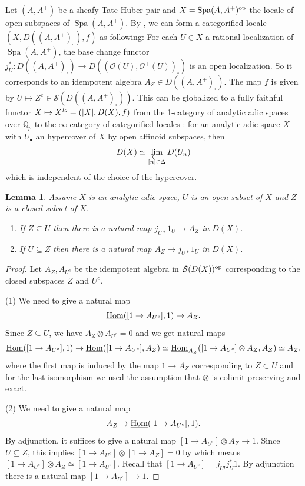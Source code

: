 \documentclass[a4paper,10pt]{amsart}
\theoremstyle{remark}
\theoremstyle{definition}
\theoremstyle{plain}
\newtheorem{lemma}[theorem]{Lemma}
\numberwithin{equation}{section}
\newcommand{\bbQ}{{\mathbb Q}}
\newcommand{\calO}{{\mathcal O}}
\newcommand{\calS}{{\mathcal S}}
\newcommand{\Hom}{{\rm Hom}}
\newcommand{\uHom}{\underline{\Hom}}
\DeclareMathOperator{\Spa}{Spa}
\begin{document}
Let $(A,A^+)$ be a sheafy Tate Huber pair and $X=\Spa(A,A^+)^{\rm op}$ the locale of open subspaces of $\Spa(A,A^+)$. By \cite[Prop.~2.3.2]{camargo2024analytic}, we can form a categorified locale $(X,D((A,A^+)_\square),f)$ as following: For each $U\in X$ a rational localization of $\Spa(A,A^+)$, the base change functor $j_U^*: D((A,A^+)_\square)\to D((\calO(U),\calO^+(U))_\square)$ is an open localization. So it corresponds to an idempotent algebra $A_Z\in D((A,A^+)_\square)$. The map $f$ is given by $U\mapsto Z^c\in \calS(D((A,A^+)_\square))$. This can be globalized to a fully faithful functor $X\mapsto X^{\it lo}=(|X|,D(X),f)$ from the 1-category of analytic adic spaces over $\bbQ_p$ to the $\infty$-category of categorified locales \cite[Cor.~2.3.4]{camargo2024analytic}: for an analytic adic space $X$ with $U_{\bullet} $ an hypercover of $X$ by open affinoid subspaces, then 
\begin{equation}\label{equationformulaDX}
	D(X)\simeq\varprojlim_{[n]\in \Delta} D(U_{n})
\end{equation}
which is independent of the choice of the hypercover.
\begin{lemma}\label{lemmafactor} 
Assume $X$ is an analytic adic space, $U$ is an open subset of $X$ and $Z$ is a closed subset of $X$.
	\begin{enumerate}
	    \item If $Z\subseteq U$ then there is a natural map $j_{U*}1_{U}\to A_Z$ in $D(X)$. 
		\item If $U\subseteq Z$ then there is a natural map $A_Z\to j_{U*}1_{U}$ in $D(X)$.
	\end{enumerate}
\end{lemma}
\begin{proof}
	Let $A_Z,A_{U^c}$ be the idempotent algebra in $\calS(D(X))^{\rm op}$ corresponding to the closed subspaces $Z$ and $U^c$.

	(1) We need to give a natural map 
	$$\uHom([1\to A_{U^c}],1)\to A_Z.$$
	Since $Z\subseteq U$, we have $A_Z\otimes A_{U^c}=0$ \cite[Prop.~5.3(1)]{scholze2022complex} and we get natural maps
	$$\uHom([1\to A_{U^c}],1)\to \uHom([1\to A_{U^c}],A_Z)\simeq \uHom_{A_Z}([1\to A_{U^c}]\otimes A_Z,A_Z)\simeq A_Z,$$
	where the first map is induced by the map $1\rightarrow A_Z$ corresponding to $Z\subset U$ and for the last isomorphism we used the assumption that $\otimes$ is colimit preserving and exact.

	(2) We need to give a natural map
	$$A_Z\to \uHom([1\to A_{U^c}],1).$$
	By adjunction, it suffices to give a natural map $[1\to A_{U^c}]\otimes A_Z\to 1$. Since $U\subseteq Z$, this implies $[1\to A_{U^c}]\otimes [1\to A_Z]=0$ by \cite[Prop.~5.3(3)]{scholze2022complex} which means $[1\to A_{U^c}]\otimes A_Z\simeq [1\to A_{U^c}]$. Recall that $[1\rightarrow A_{U^c}]=j_{U!}j_{U}^*1$. By adjunction there is a natural map $[1\rightarrow A_{U^c}]\to 1$. 
	\end{proof}
\end{document}
